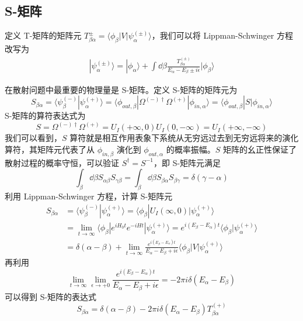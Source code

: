 \subsection{S-矩阵}
定义 T-矩阵的矩阵元 $T_{\beta\alpha}^{\pm}=\langle \phi_\beta|V|\psi_\alpha^{(\pm)}\rangle$，我们可以将 Lippman-Schwinger 方程改写为
\begin{equation}
\begin{aligned}
|\psi_\alpha^{(\pm)}\rangle= |\phi_{\alpha}\rangle+\int \dd\beta \frac{T_{\beta\alpha}^{(\pm)}}{E_\alpha-E_\beta\pm i\epsilon}|\phi_{\beta}\rangle
\end{aligned}
\end{equation}

在散射问题中最重要的物理量是 S-矩阵。定义 S-矩阵的矩阵元为
\begin{equation}
S_{\beta\alpha}=\langle \psi_{\beta}^{(-)}| \psi_{\alpha}^{(+)}\rangle=\langle \phi_{out,\beta}| \Omega^{(-)\dagger}\Omega^{(+)}|\phi_{in,\alpha}\rangle=\langle \phi_{out,\beta}| S |\phi_{in,\alpha}\rangle
\end{equation}
S-矩阵的算符表达式为
\begin{equation}
S=\Omega^{(-)\dagger}\Omega^{(+)}=U_I(+\infty,0)U_I(0,-\infty)=U_I(+\infty,-\infty)
\end{equation}
我们可以看到，$S$ 算符就是相互作用表象下系统从无穷远过去到无穷远将来的演化算符，其矩阵元代表了从 $\phi_{in,\beta}$ 演化到 $\phi_{out,\alpha}$ 的概率振幅。$S$ 矩阵的幺正性保证了散射过程的概率守恒，可以验证 $S^\dagger=S^{-1}$，即 S-矩阵元满足
\begin{equation}
\int_{\beta}\dd \beta S_{\alpha\beta}S_{\gamma\beta}=\int_{\beta}\dd \beta S_{\beta\alpha}S_{\beta\gamma}=\delta(\gamma-\alpha)
\end{equation}
利用 Lippman-Schwinger 方程，计算 S-矩阵元
\begin{equation}
\begin{aligned}
S_{\beta\alpha}&=\langle \psi_{\beta}^{(-)}| \psi_{\alpha}^{(+)}\rangle = \langle \phi_\beta|U_I(\infty,0)|\psi_{\alpha}^{(+)}\rangle\\
&=\lim\limits_{t\rightarrow \infty} \langle \phi_\beta|e^{iH_0 t}e^{-iHt}|\psi_{\alpha}^{(+)}\rangle=e^{i(E_\beta-E_\alpha)t}\langle \phi_\beta|\psi_{\alpha}^{(+)}\rangle\\
&=\delta(\alpha-\beta) + \lim\limits_{t\rightarrow \infty} \frac{e^{i(E_\beta-E_\alpha)t}}{E_\alpha-E_\beta+i\epsilon} \langle \phi_\beta|V|\psi_\alpha^{(+)}\rangle
\end{aligned}
\end{equation}
再利用
\begin{equation}
\lim\limits_{t\rightarrow \infty}\lim\limits_{\epsilon\rightarrow +0} \frac{e^{i(E_\beta-E_\alpha)t}}{E_\alpha-E_\beta+i\epsilon}=-2\pi i \delta(E_\alpha-E_\beta)
\end{equation}
可以得到 S-矩阵的表达式
\begin{equation}
S_{\beta\alpha}=\delta(\alpha-\beta)-2\pi i \delta(E_\alpha-E_\beta)T_{\beta\alpha}^{(+)}
\end{equation}

